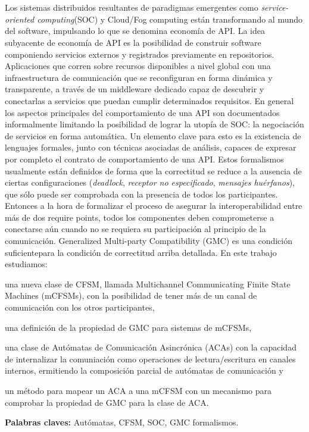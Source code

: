 \chapter*{\runtitulo}

Los sistemas distribuidos resultantes de paradigmas emergentes como \emph{service-oriented computing}(SOC) y Cloud/Fog computing están transformando al mundo del software, impulsando lo que se denomina economía de API. La idea subyacente de economía de API es la posibilidad de construir software componiendo servicios externos y registrados previamente en repositorios. Aplicaciones que corren sobre recursos disponibles a nivel global con una infraestructura de comunicación que se reconfiguran en forma dinámica y transparente, a través de un middleware dedicado capaz de descubrir y conectarlas a servicios que puedan cumplir determinados requisitos. 
En general los aspectos principales del comportamiento de una API son documentados informalmente limitando la posibilidad de lograr la utopía de SOC: la negociación de servicios en forma automática. Un elemento clave para esto es la existencia de lenguajes formales, junto con técnicas asociadas de análisis, capaces de expresar por completo el contrato de comportamiento de una API. Estos formalismos usualmente están definidos de forma que la correctitud se reduce a la ausencia de ciertas configuraciones (\emph{deadlock}, \emph{receptor no especificado}, \emph{mensajes huérfanos}), que sólo puede ser comprobada con la presencia de todos los participantes. Entonces a la hora de formalizar el proceso de asegurar la interoperabilidad entre más de dos require points, todos los componentes deben comprometerse a conectarse aún cuando no se requiera su participación al principio de la comunicación. Generalized Multi-party Compatibility (GMC) es una condición suficientepara la condición de correctitud arriba detallada. En este trabajo estudiamos: 
\begin{inparaenum}[1)] 
\item una nueva clase de CFSM, llamada Multichannel Communicating Finite State Machines (mCFSMs), con la posibilidad de tener más de un canal de comunicación con los otros participantes, 
\item una definición de la propiedad de GMC para sistemas de mCFSMs,
\item una clase de Autómatas de Comunicación Asincrónica (ACAs) con la capacidad de internalizar la comuniación como operaciones de lectura/escritura en canales internos, ermitiendo la composición parcial de autómatas de comunicación y
\item un método para mapear un ACA a una mCFSM con un mecanismo para comprobar la propiedad de GMC para la clase de ACA.
\end{inparaenum}

\bigskip

\noindent\textbf{Palabras claves:} Autómatas, CFSM, SOC, GMC formalismos.